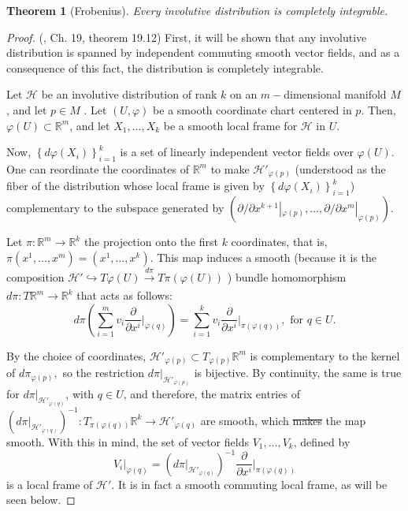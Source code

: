 \documentclass[12pt, letterpaper, reqno]{amsart}
\theoremstyle{definition}
\theoremstyle{plain}
\newtheorem{thm}{Theorem}
\theoremstyle{remark}
\providecommand{\DIFadd}[1]{{\protect\color{blue}\uwave{#1}}} %
\providecommand{\DIFdel}[1]{{\protect\color{red}\sout{#1}}}                      %
\providecommand{\DIFaddbegin}{} %
\providecommand{\DIFaddend}{} %
\providecommand{\DIFdelbegin}{} %
\providecommand{\DIFdelend}{} %
\newcommand{\DIFscaledelfig}{0.5}
\newlength{\DIFdelgraphicswidth} %
\newlength{\DIFdelgraphicsheight} %
\newcommand{\DIFaddincludegraphics}[2][]{{\color{blue}\fbox{\DIFOincludegraphics[#1]{#2}}}} %
\newcommand{\DIFdelincludegraphics}[2][]{%
\sbox{\DIFdelgraphicsbox}{\DIFOincludegraphics[#1]{#2}}%
\settoboxwidth{\DIFdelgraphicswidth}{\DIFdelgraphicsbox} %
\settoboxtotalheight{\DIFdelgraphicsheight}{\DIFdelgraphicsbox} %
\scalebox{\DIFscaledelfig}{%
\parbox[b]{\DIFdelgraphicswidth}{\usebox{\DIFdelgraphicsbox}\\[-\baselineskip] \rule{\DIFdelgraphicswidth}{0em}}\llap{\resizebox{\DIFdelgraphicswidth}{\DIFdelgraphicsheight}{%
\setlength{\unitlength}{\DIFdelgraphicswidth}%
\begin{picture}(1,1)%
\thicklines\linethickness{2pt} %
{\color[rgb]{1,0,0}\put(0,0){\framebox(1,1){}}}%
{\color[rgb]{1,0,0}\put(0,0){\line( 1,1){1}}}%
{\color[rgb]{1,0,0}\put(0,1){\line(1,-1){1}}}%
\end{picture}%
}\hspace*{3pt}}} %
} %
\DeclareRobustCommand{\DIFaddbegin}{\DIFOaddbegin \let\includegraphics\DIFaddincludegraphics} %
\DeclareRobustCommand{\DIFaddend}{\DIFOaddend \let\includegraphics\DIFOincludegraphics} %
\DeclareRobustCommand{\DIFdelbegin}{\DIFOdelbegin \let\includegraphics\DIFdelincludegraphics} %
\DeclareRobustCommand{\DIFdelend}{\DIFOaddend \let\includegraphics\DIFOincludegraphics} %
\begin{document}
\begin{thm}[Frobenius]
	Every involutive distribution is completely integrable.	
\end{thm}

\begin{proof}
	(\cite{lee2003introduction}, Ch. 19, theorem 19.12) First, it will be shown that any involutive distribution is spanned by independent commuting smooth vector fields, and as a consequence of this fact, the distribution is completely integrable.

	Let $ \mathcal{H} $ be an involutive distribution of rank $ k $ on an $ m- $dimensional manifold $ M $, and let $ p\in M $ . Let $ (U,\varphi) $ be a smooth coordinate chart centered in $ p. $ Then, $ \varphi(U)\subset \mathbb{R}^m $, and let $ X_1,\dots,X_k $ be a smooth local frame for $ \mathcal{H} $ in $ U. $

	Now, $ \left\{ d\varphi \left( X_i \right) \right\}_{i=1}^k $ is a set of linearly independent vector fields over $ \varphi(U). $ One can reordinate the coordinates of $ \mathbb{R}^m $ to make $ \mathcal{H}'_{\varphi(p)} $ (understood as the fiber of the distribution whose local frame is given by $ \left\{ d\varphi \left( X_i \right) \right\}_{i=1}^k $) complementary to the subspace generated by $ \left( \partial/\partial x^{k+1}|_{\varphi(p)},\dots,\partial/\partial x^{m}|_{\varphi(p)} \right). $   

	Let $ \pi: \mathbb{R}^m \rightarrow  \mathbb{R}^k$ the projection onto the first $ k $ coordinates, that is, $ \pi(x^1,\dots,x^m)=(x^1,\dots,x^k). $ This map induces a smooth (because it is the composition $\mathcal{H}' \hookrightarrow T\varphi(U) \xrightarrow[]{d\pi} T\pi(\varphi(U))$ )  bundle homomorphism $ d\pi: T \mathbb{R}^m \rightarrow \mathbb{R}^k	 $ that acts as follows:
	$$ d\pi \left( \sum_{i=1}^m v_i \frac{\partial}{\partial x^i} \Big|_{\varphi(q)}   \right) = \sum_{i=1}^k v_i \frac{\partial}{\partial x^i} \Big|_{\pi(\varphi(q))}, \text{ for }q\in U.$$ 

	By the choice of coordinates, $ \mathcal{H}'_{\varphi(p)}\subset T_{\varphi(p)} \mathbb{R}^m $ is complementary to the kernel of $ d\pi_{\varphi(p)}, $ so the restriction $ d\pi|_{\mathcal{H}'_{\varphi(p)}} $ is bijective. By continuity, the same is true for $ d\pi|_{\mathcal{H}'_{\varphi(q)}} $, with $ q\in U $, and therefore, the matrix entries of $ \left(d\pi|_{\mathcal{H}'_{\varphi(q)}} \right)^{-1}: T_{\pi(\varphi(q))} \mathbb{R}^k \rightarrow \mathcal{H}'_{\varphi(q)}$ are smooth, which \DIFdelbegin \DIFdel{makes }\DIFdelend \DIFaddbegin \DIFadd{implies that }\DIFaddend the map smooth. With this in mind, the set of vector fields $ V_1,\dots,V_k $, defined by
	$$ V_i|_{\varphi(q)}= \left(  d\pi|_{\mathcal{H}'_{\varphi(q)}}  \right)^{-1} \frac{\partial}{\partial x^i} \Big|_{\pi(\varphi(q))} $$ 
	is a local frame of $ \mathcal{H'}. $ It is in fact a smooth commuting local frame, as will be seen below. 


\end{proof}
\end{document}
